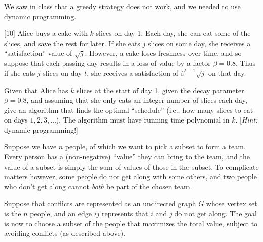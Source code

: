 \documentclass[addpoints]{exam}
\begin{document}
\begin{questions}
We saw in class that a greedy strategy does not work, and we needed to use dynamic programming.


[10]
Alice buys a cake with $k$ slices on day 1. Each day, she can eat some of the slices, and save the rest for later. If she eats $j$ slices on some day, she receives a ``satisfaction'' value of $\sqrt{j}$. However, a cake loses freshness over time, and so suppose that each passing day results in a loss of value by a factor $\beta = 0.8$. Thus if she eats $j$ slices on day $t$, she receives a satisfaction of $\beta^{t-1} \sqrt{j}$ on that day.

Given that Alice has $k$ slices at the start of day 1, given the decay parameter $\beta = 0.8$, and assuming that she only eats an integer number of slices each day, give an algorithm that finds the optimal ``schedule'' (i.e., how many slices to eat on days $1, 2, 3, \dots$). The algorithm must have running time polynomial in $k$.   [{\em Hint: } dynamic programming!]

Suppose we have $n$ people, of which we want to pick a subset to form a team. Every person has a (non-negative) ``value'' they can bring to the team, and the value of a subset is simply the sum of values of those in the subset. To complicate matters however, some people do not get along with some others, and two people who don't get along cannot {\em both} be part of the chosen team.

Suppose that conflicts are represented as an undirected graph $G$ whose vertex set is the $n$ people, and an edge $ij$ represents that $i$ and $j$ do not get along. The goal is now to choose a subset of the people that maximizes the total value, subject to avoiding conflicts (as described above).


\end{questions}
\end{document}
